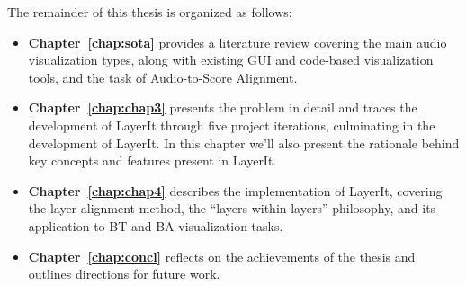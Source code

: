 The remainder of this thesis is organized as follows:
\begin{itemize}
    \item \textbf{Chapter~\ref{chap:sota}} provides a literature review covering the main audio visualization types, along with existing \ac{GUI} and code-based visualization tools, and the task of Audio-to-Score Alignment.
    \item  \textbf{Chapter~\ref{chap:chap3}} presents the problem in detail and traces the development of LayerIt through five project iterations, culminating in the development of LayerIt. In this chapter we'll also present the rationale behind key concepts and features present in LayerIt. 
    \item \textbf{Chapter~\ref{chap:chap4}} describes the implementation of LayerIt, covering the layer alignment method, the ``layers within layers'' philosophy, and its application to BT and BA visualization tasks.
    \item  \textbf{Chapter~\ref{chap:concl}} reflects on the achievements of the thesis and outlines directions for future work.
\end{itemize} 


